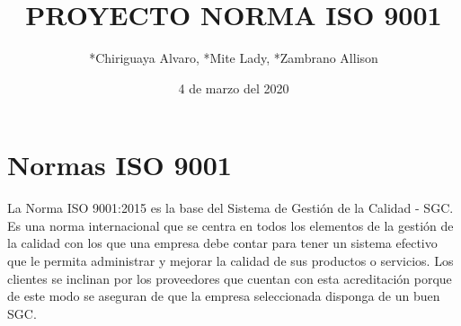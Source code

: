 \documentclass[12pt,a4paper]{article}
\title{PROYECTO NORMA ISO 9001}
\author{*Chiriguaya Alvaro, *Mite Lady, *Zambrano Allison}
\date{4 de marzo del 2020}
\begin{document}
\section{Normas ISO 9001}
La Norma ISO 9001:2015 es la base del Sistema de Gestión de la Calidad - SGC. Es una norma internacional que se centra en todos los elementos de la gestión de la calidad con los que una empresa debe contar para tener un sistema efectivo que le permita administrar y mejorar la calidad de sus productos o servicios. 
Los clientes se inclinan por los proveedores que cuentan con esta acreditación porque de este modo se aseguran de que la empresa seleccionada disponga de un buen SGC.
\end{document}
